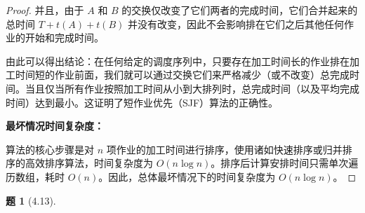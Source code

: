 \documentclass[11pt, a4paper]{article}
\newtheorem{problem}{题}
\begin{document}
\begin{proof}
    并且，由于 $A$ 和 $B$ 的交换仅改变了它们两者的完成时间，它们合并起来的总时间 $T+t(A)+t(B)$ 并没有改变，因此不会影响排在它们之后其他任何作业的开始和完成时间。
    
    由此可以得出结论：在任何给定的调度序列中，只要存在加工时间长的作业排在加工时间短的作业前面，我们就可以通过交换它们来严格减少（或不改变）总完成时间。当且仅当所有作业按照加工时间从小到大排列时，总完成时间（以及平均完成时间）达到最小。这证明了短作业优先（SJF）算法的正确性。

    \textbf{最坏情况时间复杂度：}
    
    算法的核心步骤是对 $n$ 项作业的加工时间进行排序，使用诸如快速排序或归并排序的高效排序算法，时间复杂度为 $O(n \log n)$。排序后计算安排时间只需单次遍历数组，耗时 $O(n)$。因此，总体最坏情况下的时间复杂度为 $O(n \log n)$。
\end{proof}

\begin{problem}[4.13]
\end{problem}
\end{document}
